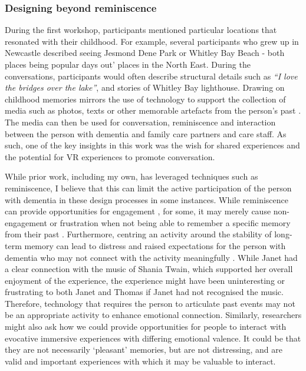 \subsubsection{Designing beyond reminiscence}
\label{ReminiscencevsMoment}
During the first workshop, participants mentioned particular locations that resonated with their childhood. For example, several participants who grew up in Newcastle described seeing Jesmond Dene Park or Whitley Bay Beach - both places being popular days out' places in the North East. During the conversations, participants would often describe structural details such as \textit{``I love the bridges over the lake''}, and stories of Whitley Bay lighthouse. Drawing on childhood memories mirrors the use of technology to support the collection of media such as photos, texts or other memorable artefacts from the person's past \citep{astell_stimulating_2010}. The media can then be used for conversation, reminiscence and interaction between the person with dementia and family care partners and care staff. As such, one of the key insights in this work was the wish for shared experiences and the potential for VR experiences to promote conversation. 

While prior work, including my own, has leveraged techniques such as reminiscence, I believe that this can limit the active participation of the person with dementia in these design processes in some instances. While reminiscence can provide opportunities for engagement \citep{gowans_designing_2004, yasuda_effectiveness_2009}, for some, it may merely cause non-engagement or frustration when not being able to remember a specific memory from their past \citep{lazar_critical_2017}. Furthermore, centring an activity around the stability of long-term memory can lead to distress and raised expectations for the person with dementia who may not connect with the activity meaningfully \citep{alm_communication_2007}. While Janet had a clear connection with the music of Shania Twain, which supported her overall enjoyment of the experience, the experience might have been uninteresting or frustrating to both Janet and Thomas if Janet had not recognised the music. Therefore, technology that requires the person to articulate past events may not be an appropriate activity to enhance emotional connection. Similarly, researchers might also ask how we could provide opportunities for people to interact with evocative immersive experiences with differing emotional valence. It could be that they are not necessarily ‘pleasant’ memories, but are not distressing, and are valid and important experiences with which it may be valuable to interact.

